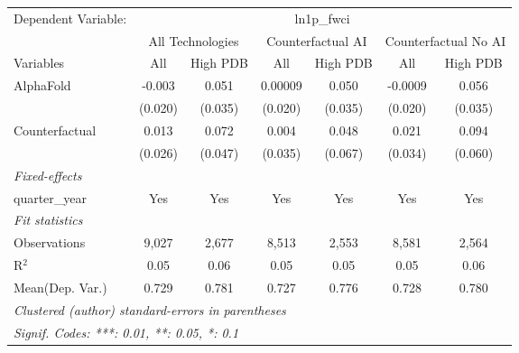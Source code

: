 \begingroup
\centering
\begin{tabular}{lcccccc}
   \tabularnewline \midrule \midrule
   Dependent Variable: & \multicolumn{6}{c}{ln1p\_fwci}\\
 & \multicolumn{2}{c}{All Technologies} & \multicolumn{2}{c}{Counterfactual AI} & \multicolumn{2}{c}{Counterfactual No AI} \\
\cmidrule(lr){1-1}\cmidrule(lr){2-3} \cmidrule(lr){4-5} \cmidrule(lr){6-7}
Variables & \multicolumn{1}{c}{All} & \multicolumn{1}{c}{High PDB} & \multicolumn{1}{c}{All} & \multicolumn{1}{c}{High PDB} & \multicolumn{1}{c}{All} & \multicolumn{1}{c}{High PDB} \\
\cmidrule(lr){1-1}\cmidrule(lr){2-2} \cmidrule(lr){3-3} \cmidrule(lr){4-4} \cmidrule(lr){5-5} \cmidrule(lr){6-6} \cmidrule(lr){7-7}
   AlphaFold      & -0.003  & 0.051   & 0.00009 & 0.050   & -0.0009 & 0.056\\   
                  & (0.020) & (0.035) & (0.020) & (0.035) & (0.020) & (0.035)\\   
   Counterfactual & 0.013   & 0.072   & 0.004   & 0.048   & 0.021   & 0.094\\   
                  & (0.026) & (0.047) & (0.035) & (0.067) & (0.034) & (0.060)\\   
   \midrule
   \emph{Fixed-effects}\\
   quarter\_year  & Yes     & Yes     & Yes     & Yes     & Yes     & Yes\\  
   \midrule
   \emph{Fit statistics}\\
   Observations   & 9,027   & 2,677   & 8,513   & 2,553   & 8,581   & 2,564\\  
   R$^2$          & 0.05    & 0.06    & 0.05    & 0.05    & 0.05    & 0.06\\  
Mean(Dep. Var.) & 0.729 & 0.781 & 0.727 & 0.776 & 0.728 & 0.780 \\
   \midrule \midrule
   \multicolumn{7}{l}{\emph{Clustered (author) standard-errors in parentheses}}\\
   \multicolumn{7}{l}{\emph{Signif. Codes: ***: 0.01, **: 0.05, *: 0.1}}\\
\end{tabular}
\par\endgroup
